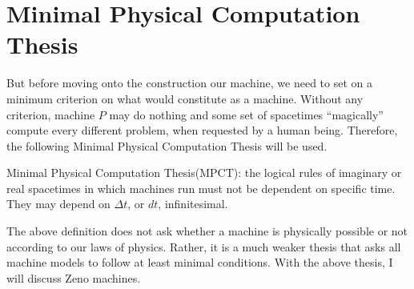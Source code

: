 \documentclass{roffin}
\begin{document}
\section{Minimal Physical Computation Thesis}
But before moving onto the construction our machine, we need to set on a minimum criterion on what would constitute as a machine. Without any criterion, machine $P$ may do nothing and some set of spacetimes ``magically'' compute every different problem, when requested by a human being. Therefore, the following Minimal Physical Computation Thesis will be used.
\begin{definition}
Minimal Physical Computation Thesis(MPCT): the logical rules of imaginary or real spacetimes in which machines run must not be dependent on specific time. They may depend on $\Delta t$, or $dt$, infinitesimal. 
\end{definition}
The above definition does not ask whether a machine is physically possible or not according to our laws of physics. Rather, it is a much weaker thesis that asks all machine models to follow at least minimal conditions. With the above thesis, I will discuss Zeno machines.
\end{document}
